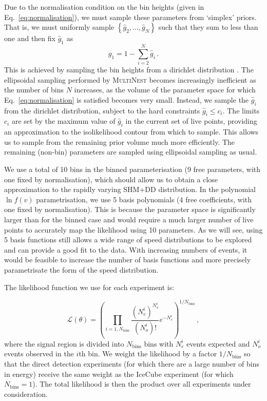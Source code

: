 Due to the normalisation condition on the bin heights (given in Eq.~\ref{eq:normalisation}), we must sample these parameters from `simplex' priors. That is, we must uniformly sample $\left\{\hat{g}_2,...,\hat{g}_N\right\}$ such that they sum to less than one and then fix $\hat{g}_1$ as
\begin{equation}
\hat{g_1} = 1 - \sum_{i = 2}^N \hat{g}_i \,.
\end{equation}
This is achieved by sampling the bin heights from a dirichlet distribution . The ellipsoidal sampling performed by \textsc{MultiNest} becomes increasingly inefficient as the number of bins $N$ increases, as the volume of the parameter space for which Eq.~\ref{eq:normalisation} is satisfied becomes very small. Instead, we sample the $\hat{g}_i$ from the dirichlet distribution, subject to the hard constraints $\hat{g}_i \leq c_i$. The limits $c_i$ are set by the maximum value of $\hat{g}_i$ in the current set of live points, providing an approximation to the isolikelihood contour from which to sample. This allows us to sample from the remaining prior volume much more efficiently.  The remaining (non-bin) parameters are sampled using ellipsoidal sampling as usual.

We use a total of 10 bins in the binned parameterisation (9 free parameters, with one fixed by normalisation), which should allow us to obtain a close approximation to the rapidly varying SHM+DD distribution. In the polynomial $\ln f(v)$ parametrisation, we use 5 basis polynomials (4 free coefficients, with one fixed by normalisation). This is because the parameter space is significantly larger than for the binned case and would require a much larger number of live points to accurately map the likelihood using 10 parameters. As we will see, using 5 basis functions still allows a wide range of speed distributions to be explored and can provide a good fit to the data. With increasing numbers of events, it would be feasible to increase the number of basis functions and more precisely parametrisate the form of the speed distribution.

The likelihood function we use for each experiment is:

\begin{equation}
\mathcal{L}(\theta) = \left(\prod_{i = 1, N_\textrm{bins}} \frac{(N_e^i)^{N_o^i}}{(N_o^i)!}e^{-N_e^i}\right)^{1/N_\textrm{bins}}\,,
\end{equation}
where the signal region is divided into $N_\textrm{bins}$ bins with $N_e^i$ events expected and $N_o^i$ events observed in the $i$th bin. We weight the likelihood by a factor $1/N_\textrm{bins}$ so that the direct detection experiments (for which there are a large number of bins in energy) receive the same weight as the IceCube experiment (for which $N_\textrm{bins} = 1$).  The total likelihood is then the product over all experiments under consideration.

